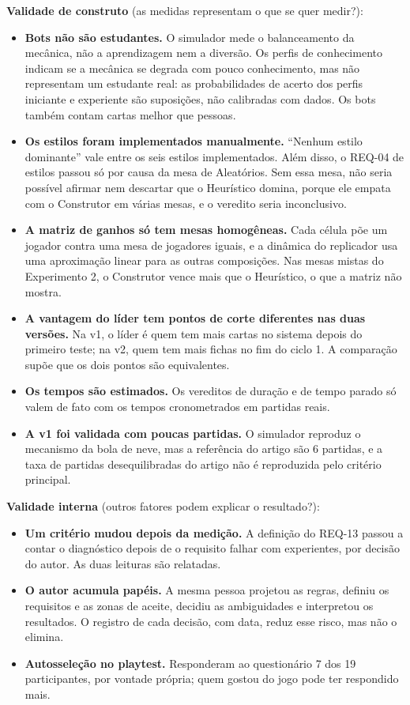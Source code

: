 \textbf{Validade de construto} (as medidas representam o que se quer medir?):
\begin{itemize}
  \item \textbf{Bots não são estudantes.} O simulador mede o balanceamento da mecânica, não a aprendizagem nem a
    diversão. Os perfis de conhecimento indicam se a mecânica se degrada com pouco conhecimento, mas não
    representam um estudante real: as probabilidades de acerto dos perfis iniciante e experiente são
    suposições, não calibradas com dados. Os bots também contam cartas melhor que pessoas.
  \item \textbf{Os estilos foram implementados manualmente.} ``Nenhum estilo dominante'' vale entre os
    seis estilos implementados. Além disso, o REQ-04 de estilos passou só por causa da mesa de Aleatórios. Sem
    essa mesa, não seria possível afirmar nem descartar que o Heurístico domina, porque ele empata com
    o Construtor em várias mesas, e o veredito seria inconclusivo.
  \item \textbf{A matriz de ganhos só tem mesas homogêneas.} Cada célula põe um jogador contra uma mesa
    de jogadores iguais, e a dinâmica do replicador usa uma aproximação linear para as outras composições. Nas
    mesas mistas do Experimento 2, o Construtor vence mais que o Heurístico, o que a matriz não mostra.
  \item \textbf{A vantagem do líder tem pontos de corte diferentes nas duas versões.} Na v1, o líder é
    quem tem mais cartas no sistema depois do primeiro teste; na v2, quem tem mais fichas no fim do ciclo 1. A
    comparação supõe que os dois pontos são equivalentes.
  \item \textbf{Os tempos são estimados.} Os vereditos de duração e de tempo parado só valem de fato com os
    tempos cronometrados em partidas reais.
  \item \textbf{A v1 foi validada com poucas partidas.} O simulador reproduz o mecanismo da bola de neve, mas a
    referência do artigo são 6 partidas, e a taxa de partidas desequilibradas do artigo não é
    reproduzida pelo critério principal.
\end{itemize}

\textbf{Validade interna} (outros fatores podem explicar o resultado?):
\begin{itemize}
  \item \textbf{Um critério mudou depois da medição.} A definição do REQ-13 passou a contar o diagnóstico depois
    de o requisito falhar com experientes, por decisão do autor. As duas leituras são relatadas.
  \item \textbf{O autor acumula papéis.} A mesma pessoa projetou as regras, definiu os requisitos e as
    zonas de aceite, decidiu as ambiguidades e interpretou os resultados. O registro de cada decisão, com data,
    reduz esse risco, mas não o elimina.
  \item \textbf{Autosseleção no playtest.} Responderam ao questionário 7 dos 19 participantes,
    por vontade própria; quem gostou do jogo pode ter respondido mais.
\end{itemize}

